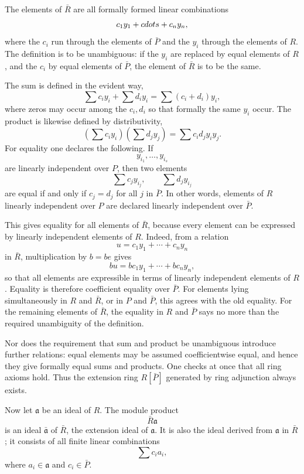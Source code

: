 \documentclass[11pt]{article}
\begin{document}
The elements of \(\bar R\) are all formally formed linear combinations
\[
  c_1y_1+\\cdots+c_ny_n,
\] where the \(c_i\) run through the elements of \(\bar P\) and the
\(y_i\) through the elements of \(R\). The definition is to be
unambiguous: if the \(y_i\) are replaced by equal elements of \(R\), and
the \(c_i\) by equal elements of \(\bar P\), the element of \(\bar R\)
is to be the same.

The sum is defined in the evident way, \[
  \sum c_i y_i+
  \sum d_i y_i=
  \sum (c_i+d_i)y_i,
\] where zeros may occur among the \(c_i,d_i\) so that formally the same
\(y_i\) occur. The product is likewise defined by distributivity, \[
  \left(\sum c_i y_i\right)
  \left(\sum d_j y_j\right)
  =\sum c_i d_j y_i y_j.
\] For equality one declares the following. If \[
  y_{i_1},\ldots,y_{i_s}
\] are linearly independent over \(P\), then two elements \[
  \sum c_j y_{i_j},\qquad \sum d_j y_{i_j}
\] are equal if and only if \(c_j=d_j\) for all \(j\) in \(\bar P\). In
other words, elements of \(R\) linearly independent over \(P\) are
declared linearly independent over \(\bar P\).

This gives equality for all elements of \(\bar R\), because every
element can be expressed by linearly independent elements of \(R\).
Indeed, from a relation \[
  u=c_1y_1+
\cdots+c_ny_n
\] in \(\bar R\), multiplication by \(b=be\) gives \[
  bu=bc_1y_1+
\cdots+bc_ny_n,
\] so that all elements are expressible in terms of linearly independent
elements of \(R\). Equality is therefore coefficient equality over
\(\bar P\). For elements lying simultaneously in \(R\) and \(\bar R\),
or in \(P\) and \(\bar P\), this agrees with the old equality. For the
remaining elements of \(\bar R\), the equality in \(R\) and \(\bar P\)
says no more than the required unambiguity of the definition.

Nor does the requirement that sum and product be unambiguous introduce
further relations: equal elements may be assumed coefficientwise equal,
and hence they give formally equal sums and products. One checks at once
that all ring axioms hold. Thus the extension ring \(R[\bar P]\)
generated by ring adjunction always exists.

Now let \(\mathfrak a\) be an ideal of \(R\). The module product \[
  \bar R\mathfrak a
\] is an ideal \(\bar{\mathfrak a}\) of \(\bar R\), the extension ideal
of \(\mathfrak a\). It is also the ideal derived from \(\mathfrak a\) in
\(\bar R\); it consists of all finite linear combinations \[
  \sum c_i a_i,
\] where \(a_i\in\mathfrak a\) and \(c_i\in\bar P\).
\end{document}
